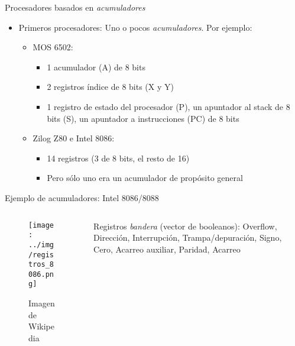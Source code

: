 \documentclass[presentation]{beamer}
\begin{document}
\begin{frame}[label={sec:org3a9cfdf}]{Procesadores basados en \emph{acumuladores}}
\begin{itemize}
\item Primeros procesadores: Uno o pocos \emph{acumuladores}. Por ejemplo:
\begin{itemize}
\item MOS 6502:
\begin{itemize}
\item 1 acumulador (A) de 8 bits
\item 2 registros índice de 8 bits (X y Y)
\item 1 registro de estado del procesador (P), un apuntador al stack
de 8 bits (S), un apuntador a instrucciones (PC) de 8 bits
\end{itemize}
\item Zilog Z80 e Intel 8086:
\begin{itemize}
\item 14 registros (3 de 8 bits, el resto de 16)
\item Pero sólo uno era un acumulador de propósito general
\end{itemize}
\end{itemize}
\end{itemize}
\end{frame}

\begin{frame}[label={sec:org30d16e1}]{Ejemplo de acumuladores: Intel 8086/8088}
\begin{columns}\begin{column}{0.5\textwidth}
\begin{figure}[htbp]
\centering
\texttt{[image: ../img/registros\_8086.png]}
\caption{Imagen de Wikipedia}
\end{figure}
\end{column}\begin{column}{0.5\textwidth}
Registros \emph{bandera} (vector de booleanos): Overflow, Dirección,
Interrupción, Trampa/depuración, Signo, Cero, Acarreo auxiliar,
Paridad, Acarreo
\end{column}\end{columns}
\end{frame}
\end{document}
